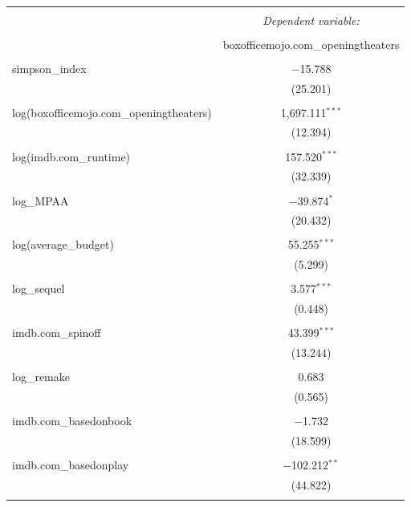 
\begin{table}[!htbp] \centering 
  \caption{} 
  \label{} 
\begin{tabular}{@{\extracolsep{5pt}}lc} 
\\[-1.8ex]\hline 
\hline \\[-1.8ex] 
 & \multicolumn{1}{c}{\textit{Dependent variable:}} \\ 
\cline{2-2} 
\\[-1.8ex] & boxofficemojo.com\_openingtheaters \\ 
\hline \\[-1.8ex] 
 simpson\_index & $-$15.788 \\ 
  & (25.201) \\ 
  & \\ 
 log(boxofficemojo.com\_openingtheaters) & 1,697.111$^{***}$ \\ 
  & (12.394) \\ 
  & \\ 
 log(imdb.com\_runtime) & 157.520$^{***}$ \\ 
  & (32.339) \\ 
  & \\ 
 log\_MPAA & $-$39.874$^{*}$ \\ 
  & (20.432) \\ 
  & \\ 
 log(average\_budget) & 55.255$^{***}$ \\ 
  & (5.299) \\ 
  & \\ 
 log\_sequel & 3.577$^{***}$ \\ 
  & (0.448) \\ 
  & \\ 
 imdb.com\_spinoff & 43.399$^{***}$ \\ 
  & (13.244) \\ 
  & \\ 
 log\_remake & 0.683 \\ 
  & (0.565) \\ 
  & \\ 
 imdb.com\_basedonbook & $-$1.732 \\ 
  & (18.599) \\ 
  & \\ 
 imdb.com\_basedonplay & $-$102.212$^{**}$ \\ 
  & (44.822) \\ 
  & \\ 

\end{tabular}
\end{table}
